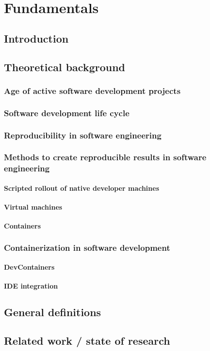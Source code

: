\chapter{Fundamentals}
\label{ch:fundamentals}

\section{Introduction}

\section{Theoretical background}
\subsection{Age of active software development projects}
\subsection{Software development life cycle}
\subsection{Reproducibility in software engineering}
\subsection{Methods to create reproducible results in software engineering}
\subsubsection{Scripted rollout of native developer machines}
\subsubsection{Virtual machines}
\subsubsection{Containers}
\subsection{Containerization in software development}
\subsubsection{DevContainers}
\subsubsection{IDE integration}

\section{General definitions}

\section{Related work / state of research}

